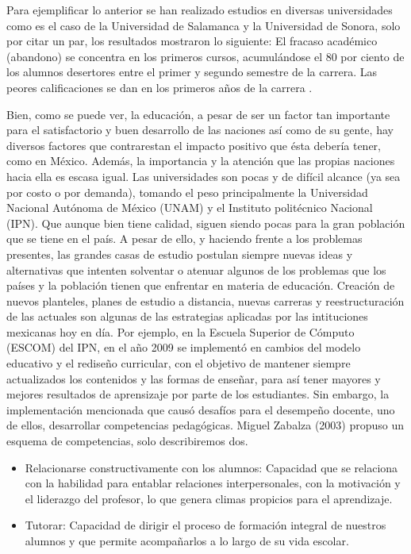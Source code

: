 \noindent
Para ejemplificar lo anterior se han realizado estudios en diversas universidades como es el caso de la 
Universidad de Salamanca y la Universidad de Sonora, solo por citar un par, los resultados mostraron lo 
siguiente: El fracaso académico (abandono) se concentra en los primeros cursos, acumulándose el 80 por 
ciento de los alumnos desertores entre el primer y segundo semestre de la carrera. Las peores 
calificaciones se dan en los primeros años de la carrera \cite{Sistemas_Educacion_Mundo}.

\noindent
Bien, como se puede ver, la educación, a pesar de ser un factor tan importante para el 
satisfactorio y buen desarrollo de las naciones así como de su gente, hay diversos factores que 
contrarestan el impacto positivo que ésta debería tener, como en México. Además, la importancia y la 
atención que las propias naciones hacia ella es escasa igual. Las universidades son pocas y de difícil 
alcance (ya sea por costo o por demanda), tomando el peso principalmente la Universidad Nacional Autónoma 
de México (UNAM) y el Instituto politécnico Nacional (IPN). Que aunque bien tiene calidad, siguen siendo 
pocas para la gran población que se tiene en el país. A pesar de ello, y haciendo frente a los problemas 
presentes, las grandes casas de estudio postulan siempre nuevas ideas y alternativas que intenten solventar 
o atenuar algunos de los problemas que los países y la población tienen que enfrentar en materia de 
educación. 
Creación de nuevos planteles, planes de estudio a distancia, nuevas carreras y reestructuración de las 
actuales son algunas de las estrategias aplicadas por las intituciones mexicanas hoy en día. Por ejemplo, 
en la Escuela Superior de Cómputo (ESCOM) del IPN, en el año 2009 se implementó en cambios del modelo 
educativo y el rediseño curricular, con el objetivo de mantener siempre actualizados los contenidos y las 
formas de enseñar, para así tener mayores y mejores resultados de aprensizaje por parte de los estudiantes. 
Sin embargo, la implementación mencionada que causó desafíos para el desempeño docente, uno de ellos, 
desarrollar competencias pedagógicas. Miguel Zabalza (2003) propuso un esquema de competencias, solo 
describiremos dos.

\begin{itemize}	
	\item Relacionarse constructivamente con los alumnos: Capacidad que  se relaciona con la  habilidad 
	para entablar relaciones  interpersonales, con la motivación y  el liderazgo del profesor, lo que  
	genera climas propicios para el  aprendizaje.
	\item Tutorar: Capacidad de dirigir el proceso de formación integral de nuestros alumnos y que 
	permite acompañarlos a lo largo de su vida escolar.
\end{itemize}


